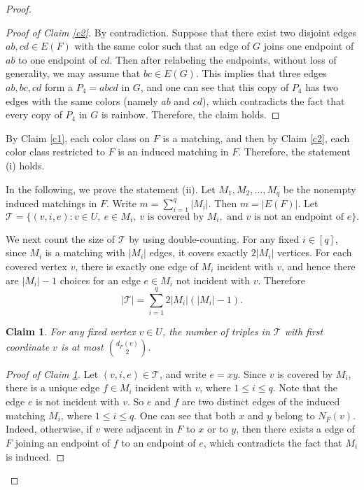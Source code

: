 \documentclass[11pt,a4paper]{article}
\newtheorem{claim}{Claim}
\begin{document}
\begin{proof}
\begin{proof}[Proof of Claim \ref{c2}]

By contradiction. Suppose that there exist two disjoint edges $ab,cd\in E(F)$  with the same color such that  
 an edge of $G$ joins one endpoint of $ab$ to one endpoint of $cd$.
Then after relabeling the endpoints, without loss of generality, we may assume that $bc\in E(G)$.  
This implies that three edges $ab,bc,cd$  form a $P_4=abcd$ in $G$, and one can see that this copy of $P_4$ has two  edges with the same colors (namely $ab$ and $cd$), which  contradicts the fact that every copy of $P_4$ in $G$ is rainbow.  Therefore, the claim holds.
\end{proof}


By Claim \ref{c1},  each color class on $F$ is a matching, and then by Claim \ref{c2}, each color class
restricted to $F$ is  an induced matching in $F$. Therefore, the statement (i) holds.



In the following, we prove the statement (ii).
Let $M_1,M_2,\ldots,M_q$ be the nonempty induced matchings in $F$.
Write $ m=\sum_{i=1}^q |M_i|$. Then $m=|E(F)|$.
Let 
\[
\mathcal T=\{(v,i,e): v\in U,\ e\in M_i,\ v\text{ is covered by }M_i,
\text{ and }v\text{ is not an endpoint of }e\}.
\] 

We next count  the size of $\mathcal T$ by using double-counting.
For any fixed $i\in [q]$, since $M_i$ is a matching with $|M_i|$ edges, it covers exactly $2|M_i|$
vertices.  For each covered vertex $v$, there is exactly one edge of $M_i$
incident with $v$, and hence there are $|M_i|-1$ choices for an edge
$e\in M_i$ not incident with $v$.  Therefore
\begin{equation}\label{eq:T-lower}
|\mathcal T|=\sum_{i=1}^q 2|M_i|(|M_i|-1).
\end{equation}

\begin{claim}\label{c3}
For any fixed  vertex $v\in U$,  the number of triples in
$\mathcal T$ with first coordinate $v$ is at most $\binom{d_{\overline {F}}(v)}{2}$.  
\end{claim}

\begin{proof}[Proof of Claim \ref{c3}]
Let $(v,i,e)\in\mathcal T$, and write $e=xy$.  
Since $v$ is covered by $M_i$, there is a unique edge $f\in M_i$ incident with $v$, where $1\le i\le q$.  
Note that the edge $e$ is not incident with $v$. 
So $e$ and $f$ are two distinct edges of the induced matching $M_i$, where $1\le i\le q$.  
One can see that both $x$ and $y$ belong to $N_{\overline F}(v)$.
Indeed, otherwise, if $v$ were adjacent in $F$ to $x$ or to $y$, then there exists a edge of $F$  joining an
endpoint of $f$ to an endpoint of $e$, which contradicts the fact that $M_i$ is induced.


\end{proof}
\end{proof}
\end{document}
